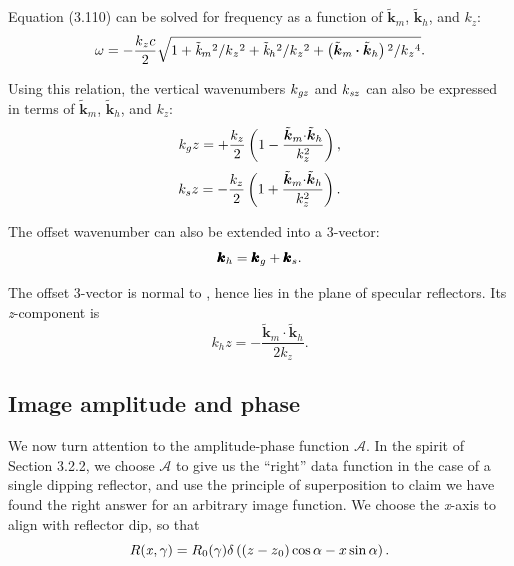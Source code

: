 Equation (3.110) can be solved for frequency as a function of \(\tilde{\boldsymbol{k}}_m\), \(\tilde{\boldsymbol{k}}_h\), and \(k_z\):
\begin{equation}\omega =- \frac{\text{\textit{$k$}}_{\text{\textit{$z$}}}\text{\textit{$c$}}}{2}\sqrt{1+\text{\textit{$\tilde{\text{\textit{k}}}$}}_{\text{\textit{$m$}}}{}^2/\text{\textit{$k$}}_{\text{\textit{$z$}}}{}^2+\text{\textit{$\tilde{\text{\textit{k}}}$}}_{\text{\textit{$h$}}}{}^2/\text{\textit{$k$}}_{\text{\textit{$z$}}}{}^2+\left(\tilde{\boldsymbol{k}}_{\text{\textit{$m$}}}\pmb{\cdot} \tilde{\boldsymbol{k}}_{\text{\textit{$h$}}}\right){}^2/\text{\textit{$k$}}_{\text{\textit{$z$}}}{}^4}.
\end{equation}

Using this relation, the vertical wavenumbers \(k_{\text{\textit{gz}}}\) and \(k_{\text{\textit{sz}}}\) can also be expressed in terms of \(\tilde{\boldsymbol{k}}_m\), \(\tilde{\boldsymbol{k}}_h\), and \(k_z\):
\begin{equation}
k_gz=+ \frac{k_z}{2}\left(1-\frac{{\tilde{\boldsymbol k}}_m{\bf \cdot}{\tilde{\boldsymbol k}_h}}{k_z^2}\right),
\end{equation}
\begin{equation}
k_sz=- \frac{k_z}{2}\left(1+\frac{{\tilde{\boldsymbol k}}_m{\bf \cdot}{\tilde{\boldsymbol k}_h}}{k_z^2}\right).\end{equation}

The offset wavenumber can also be extended into a 3-vector:
\begin{equation}\pmb{\text{\textit{$\boldsymbol{k}$}}}_{\text{\textit{${h}$}}}=\text{\textit{$\pmb{\text{\textit{$\boldsymbol{k}$}}}_g$}}+\text{\textit{$\pmb{\text{\textit{$\boldsymbol{k}$}}}_s.$}}\end{equation}

The offset 3-vector is normal to \!, hence lies in the plane of specular reflectors. Its \textit{z}-component is
\begin{equation}k_hz=-\frac{\tilde{\boldsymbol k}_m\cdot
{\tilde{\boldsymbol k}_h}}{2k_z}.\end{equation}


\subsection{Image amplitude and phase}

We now turn attention to the amplitude-phase function $\mathcal{A}$. In the spirit of Section 3.2.2, we choose $\mathcal{A}$ to give us the ``right''
data function in the case of a single dipping reflector, and use the principle of superposition to claim we have found the right answer for an arbitrary image function. We choose the \textit{x}-axis to align with reflector dip, so that
\begin{equation}\text{\textit{$R$}}({\mathbf{\mathit{x}}},\gamma ) =\text{\textit{$R$}}_0(\gamma )\delta \left(\left(\text{\textit{$z$}}-\text{\textit{$z$}}_0\right)\cos
 \alpha -\text{\textit{$x$}}\text{\textit{$ $}}\sin  \alpha \right).\end{equation}

